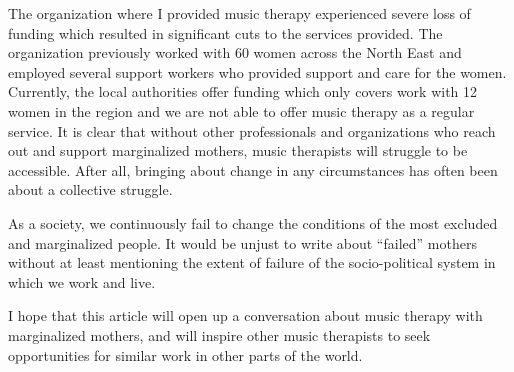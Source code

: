 \documentclass[authordate, empirical]{jote-new-article}
\begin{document}
	The organization where I provided music therapy experienced severe loss of funding which resulted in significant cuts to the services provided. The organization previously worked with 60 women across the North East and employed several support workers who provided support and care for the women. Currently, the local authorities offer funding which only covers work with 12 women in the region and we are not able to offer music therapy as a regular service. It is clear that without other professionals and organizations who reach out and support marginalized mothers, music therapists will struggle to be accessible. After all, bringing about change in any circumstances has often been about a collective struggle.







	As a society, we continuously fail to change the conditions of the most excluded and marginalized people. It would be unjust to write about “failed” mothers without at least mentioning the extent of failure of the socio-political system in which we work and live.



	I hope that this article will open up a conversation about music therapy with marginalized mothers, and will inspire other music therapists to seek opportunities for similar work in other parts of the world.
\end{document}
